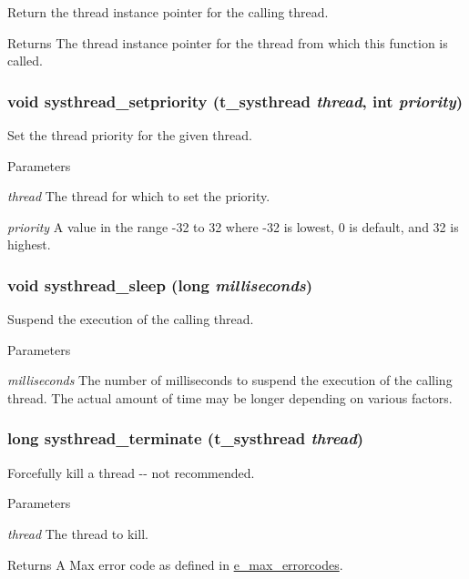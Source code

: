 Return the thread instance pointer for the calling thread. \begin{DoxyReturn}{Returns}
The thread instance pointer for the thread from which this function is called. 
\end{DoxyReturn}
\hypertarget{group__threading_ga4e4b35c628d791550e5523c4b554d466}{
\subsubsection[{systhread\_\-setpriority}]{\setlength{\rightskip}{0pt plus 5cm}void systhread\_\-setpriority ({\bf t\_\-systhread} {\em thread}, \/  int {\em priority})}}
\label{group__threading_ga4e4b35c628d791550e5523c4b554d466}


Set the thread priority for the given thread. 
\begin{DoxyParams}{Parameters}
\item[{\em thread}]The thread for which to set the priority. \item[{\em priority}]A value in the range -\/32 to 32 where -\/32 is lowest, 0 is default, and 32 is highest. \end{DoxyParams}
\hypertarget{group__threading_gad1ca1694ee14824a56916d8f67d7966b}{
\subsubsection[{systhread\_\-sleep}]{\setlength{\rightskip}{0pt plus 5cm}void systhread\_\-sleep (long {\em milliseconds})}}
\label{group__threading_gad1ca1694ee14824a56916d8f67d7966b}


Suspend the execution of the calling thread. 
\begin{DoxyParams}{Parameters}
\item[{\em milliseconds}]The number of milliseconds to suspend the execution of the calling thread. The actual amount of time may be longer depending on various factors. \end{DoxyParams}
\hypertarget{group__threading_gaacc57aeddc69c01e7562397bdf6f12f5}{
\subsubsection[{systhread\_\-terminate}]{\setlength{\rightskip}{0pt plus 5cm}long systhread\_\-terminate ({\bf t\_\-systhread} {\em thread})}}
\label{group__threading_gaacc57aeddc69c01e7562397bdf6f12f5}


Forcefully kill a thread -\/-\/ not recommended. 
\begin{DoxyParams}{Parameters}
\item[{\em thread}]The thread to kill. \end{DoxyParams}
\begin{DoxyReturn}{Returns}
A Max error code as defined in \hyperlink{group__misc_ga0764dd6c02b76cca7d053ae50555d69d}{e\_\-max\_\-errorcodes}. 
\end{DoxyReturn}
